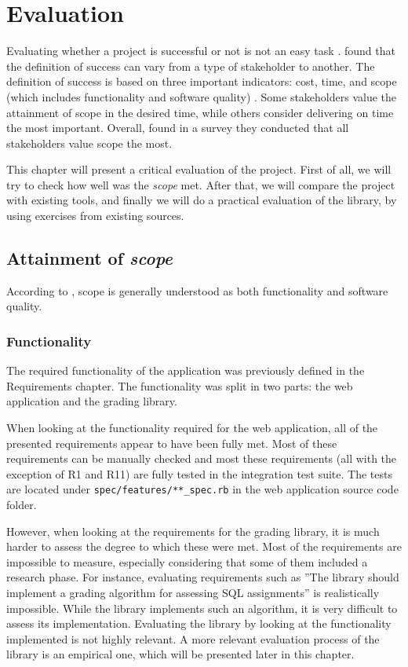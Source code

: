 \chapter{Evaluation}

Evaluating whether a project is successful or not is not an easy task \citep{lit:definining_success}. \cite{lit:definining_success} found that the definition of success can vary from a type of stakeholder to another. The definition of success is based on three important indicators: cost, time, and scope (which includes functionality and software quality) \citep{lit:definining_success}. Some stakeholders value the attainment of scope in the desired time, while others consider delivering on time the most important. Overall, \cite{lit:definining_success} found in a survey they conducted that all stakeholders value scope the most.

This chapter will present a critical evaluation of the project. First of all, we will try to check how well was the \textit{scope} met. After that, we will compare the project with existing tools, and finally we will do a practical evaluation of the library, by using exercises from existing sources.

\section{Attainment of \textit{scope}}
According to \cite{lit:definining_success}, scope is generally understood as both functionality and software quality.

\subsection{Functionality}

The required functionality of the application was previously defined in the Requirements chapter. The functionality was split in two parts: the web application and the grading library.

When looking at the functionality required for the web application, all of the presented requirements appear to have been fully met. Most of these requirements can be manually checked and most these requirements (all with the exception of R1 and R11) are fully tested in the integration test suite. The tests are located under \texttt{spec/features/**\_spec.rb} in the web application source code folder.


However, when looking at the requirements for the grading library, it is much harder to assess the degree to which these were met. Most of the requirements are impossible to measure, especially considering that some of them included a research phase. For instance, evaluating requirements such as ''The library should implement a grading algorithm for assessing SQL assignments'' is realistically impossible. While the library implements such an algorithm, it is very difficult to assess its implementation. Evaluating the library by looking at the functionality implemented is not highly relevant. A more relevant evaluation process of the library is an empirical one, which will be presented later in this chapter.

